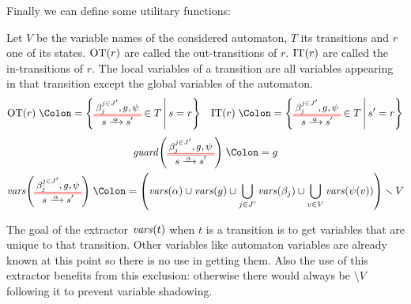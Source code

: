\documentclass{article}
\begin{document}
Finally we can define some utilitary functions:
\begin{defi}
Let \(V\) be the variable names of the considered automaton, \(T\) its transitions and \(r\) one of its states.
\(\mathrm{OT}{\left(r\right)}\) are called the out-transitions of \(r\).
\(\mathrm{IT}{\left(r\right)}\) are called the in-transitions of \(r\).
The local variables of a transition are all variables appearing in that transition except the global variables of the automaton.
\begin{align*}
	\fOT{r} & \defnotation \mset{\OTg \in T}{s = r} &
	\fIT{r} & \defnotation \mset{\OTg \in T}{s' = r} \\
\end{align*}
\vspace{-1cm}
\begin{gather*}
	\fguard{\OTg} \defnotation g \\
	\fvars{\OTg} \defnotation \mpar{\fvars{\alpha} \cup \fvars{g} \cup \bigcup_{j \in J'} \fvars{\beta_j} \cup \bigcup_{v \in V} \fvars{\psi\mpar{v}}} \setminus V
\end{gather*}
\end{defi}
The goal of the extractor \(\mathit{vars}{\left(t\right)}\) when \(t\) is a transition is to get variables that are unique to that transition.
Other variables like automaton variables are already known at this point so there is no use in getting them.
Also the use of this extractor benefits from this exclusion: otherwise there would always be \(\setminus V\) following it to prevent variable shadowing.
\end{document}
